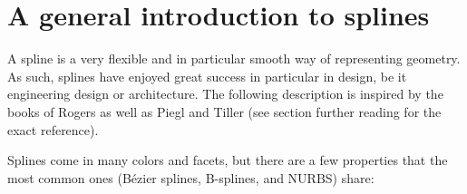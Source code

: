 \documentclass[11pt,a4paper]{article}
\begin{document}


\section{A general introduction to splines}

A spline is a very flexible and in particular smooth way of representing geometry. As such, splines have enjoyed great success in particular in design, be it engineering design or architecture. The following description is inspired by the books of Rogers as well as Piegl and Tiller (see section further reading for the exact reference).

Splines come in many colors and facets, but there are a few properties that the most common ones (Bézier splines, B-splines, and NURBS) share:
\end{document}
